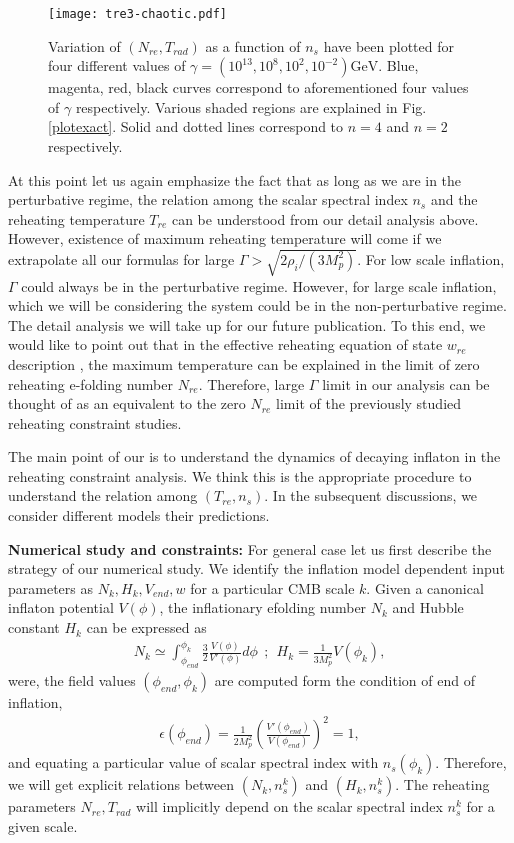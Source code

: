 \documentclass[prl,twocolumn,superscriptaddress,doublespace]{revtex4}%
\def\bea{\begin{eqnarray}}
\def\eea{\end{eqnarray}}
\begin{document}
\begin{figure}[t!]
	\begin{center}
		\texttt{[image: tre3-chaotic.pdf]}
		\caption{\scriptsize Variation of $(N_{re},T_{rad})$ as a function of $n_s$ have been plotted for four different values of $ \gamma = (10^{13},10^8, 10^2, 10^{-2})  \mbox{GeV}$.
			Blue, magenta, red, black curves correspond to aforementioned four values of $\gamma$ respectively. Various shaded regions are explained in Fig.\ref{plotexact}. Solid and dotted lines correspond to $n=4$ and $n=2$ respectively.} 
		\label{plotchaotic}
	\end{center}
\end{figure}
At this point let us again emphasize the fact that as long as we are in the perturbative regime, the relation among the scalar spectral index $n_s$ and the reheating temperature $T_{re}$ can be understood from our detail analysis above. However, existence of maximum reheating temperature will come if we extrapolate all our formulas for large $\Gamma > \sqrt{2{\rho}_i/(3 M_p^2)}$. For low scale inflation, 
$\Gamma$ could always be in the perturbative regime.
However, for large scale inflation, which we will be considering the system could be in the non-perturbative regime. The detail analysis we will take up for our future publication. To this end, we would like to point out that in the effective reheating equation of state $w_{re}$ description \cite{martin}, the maximum temperature can be explained in the limit of zero reheating e-folding number $N_{re}$. Therefore, large $\Gamma$ limit in our analysis  can be thought of as an equivalent to the zero $N_{re}$ limit of the previously studied reheating constraint studies.

The main point of our is to understand the dynamics of decaying inflaton in the reheating constraint analysis. We think this is the appropriate procedure to understand the relation among $(T_{re}, n_s)$. In the subsequent discussions, we consider different models their predictions. 
 
 

{\bf Numerical study and constraints:} For general case  let us first describe the strategy of our numerical study. We identify the inflation model dependent input parameters as $N_k, H_k, V_{end}, w$ for a particular CMB scale $k$. Given a canonical inflaton potential $V(\phi)$, the inflationary efolding number $N_k$  and Hubble constant $H_k$ can be expressed as  
\bea
N_k  \simeq \int_{\phi_{end}}^{\phi_k} \frac 3 2 \frac{V(\phi)}{V'(\phi)} d\phi ~~;~~H_k = \frac{1}{3 M_p^2} V(\phi_k),
\eea
were, the field values $(\phi_{end},\phi_k)$ are computed form the condition of end of inflation,
\bea
\epsilon(\phi_{end}) = \frac{1}{2 M_p^2} \left(\frac{V'(\phi_{end})}{V(\phi_{end})}\right)^2 =1, 
\eea
and equating a particular value of scalar spectral index with $n_s(\phi_k)$.
Therefore, we will get explicit relations between $(N_k,n_s^k)$ and $(H_k, n_s^k)$.
The reheating parameters $N_{re},T_{rad}$ will implicitly depend on the scalar spectral index $n_s^k$ for a given scale. 
\end{document}
